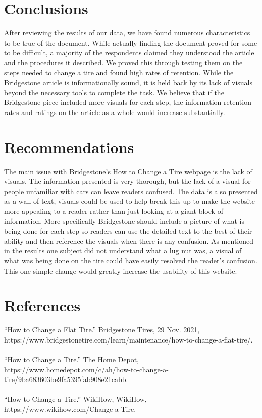 \documentclass[12pt,A4paper]{article}
\begin{document}
	\section{Conclusions}
	After reviewing the results of our data, we have found numerous characteristics to be true of the document. While actually finding the document proved for some to be difficult, a majority of the respondents claimed they understood the article and the procedures it described. We proved this through testing them on the steps needed to change a tire and found high rates of retention. While the Bridgestone article is informationally sound, it is held back by its lack of visuals beyond the necessary tools to complete the task. We believe that if the Bridgestone piece included more visuals for each step, the information retention rates and ratings on the article as a whole would increase substantially.

	\section{Recommendations}
	The main issue with Bridgestone’s How to Change a Tire webpage is the lack of visuals. The information presented is very thorough, but the lack of a visual for people unfamiliar with cars can leave readers confused. The data is also presented as a wall of text, visuals could be used to help break this up to make the website more appealing to a reader rather than just looking at a giant block of information. More specifically Bridgestone should include a picture of what is being done for each step so readers can use the detailed text to the best of their ability and then reference the visuals when there is any confusion. As mentioned in the results one subject did not understand what a lug nut was, a visual of what was being done on the tire could have easily resolved the reader's confusion. This one simple change would greatly increase the usability of this website. 

	\section{References}
	\sloppy
	“How to Change a Flat Tire.” Bridgestone Tires, 29 Nov. 2021, https://www.bridgestonetire.com/learn/maintenance/how-to-change-a-flat-tire/.\\ \\
	“How to Change a Tire.” The Home Depot, https://www.homedepot.com/c/ah/how-to-change-a-tire/9ba683603be9fa5395fab908e21cabb.\\ \\
	“How to Change a Tire.” WikiHow, WikiHow, https://www.wikihow.com/Change-a-Tire.\\
	
	
\end{document}
